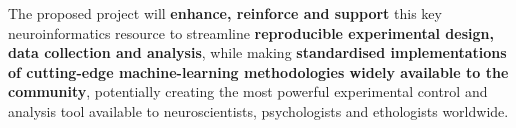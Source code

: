 The proposed project will \textbf{enhance, reinforce and support} this key neuroinformatics
  resource to streamline \textbf{reproducible experimental design, data collection and analysis}, while making \textbf{standardised implementations of cutting-edge machine-learning methodologies widely available to the community}, potentially creating the most powerful experimental
control and analysis tool available to neuroscientists, psychologists and
ethologists worldwide.




%
%





